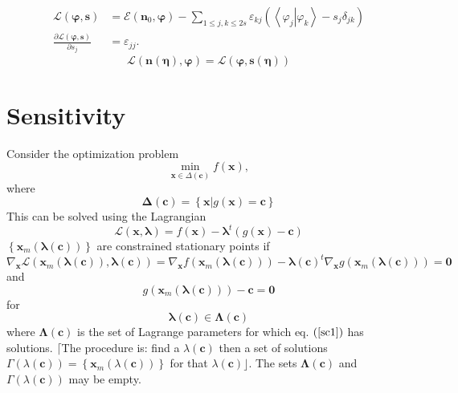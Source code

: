\documentclass[aps,preprint]{revtex4}%
\begin{document}
\begin{align}
\mathcal{L}\left(  \mathbf{\varphi,s}\right)   &  =\mathcal{E}\left(
\mathbf{n}_{0}\mathbf{,\varphi}\right)  -\sum_{1\leq j,k\leq2s}\varepsilon
_{kj}\left(  \left\langle \left.  \varphi_{j}\right\vert \varphi
_{k}\right\rangle -s_{j}\delta_{jk}\right) \\
\frac{\partial\mathcal{L}\left(  \mathbf{\varphi,s}\right)  }{\partial s_{j}}
&  =\varepsilon_{jj}.
\end{align}%
\begin{equation}
\mathcal{L}\left(  \mathbf{n\left(  \mathbf{\eta}\right)  ,\varphi}\right)
=\mathcal{L}\left(  \mathbf{\varphi,s}\left(  \mathbf{\eta}\right)  \right)
\end{equation}


\section{Sensitivity}

Consider the optimization problem
\[
\min_{\mathbf{x\in}\Delta\left(  \mathbf{c}\right)  }f\left(  \mathbf{x}%
\right)  ,
\]
where
\[
\mathbf{\Delta}\left(  \mathbf{c}\right)  \mathcal{=}\left\{  \mathbf{x}%
\left\vert g\left(  \mathbf{x}\right)  =\mathbf{c}\right.  \right\}
\]
This can be solved using the Lagrangian
\[
\mathcal{L}\left(  \mathbf{x,\lambda}\right)  =f\left(  \mathbf{x}\right)
-\mathbf{\lambda}^{t}\left(  g\left(  \mathbf{x}\right)  -\mathbf{c}\right)
\]
$\left\{  \mathbf{x}_{m}\left(  \mathbf{\lambda}\left(  \mathbf{c}\right)
\right)  \right\}  $ are constrained stationary points if
\[
\nabla_{\mathbf{x}}\mathcal{L}\left(  \mathbf{x}_{m}\left(  \mathbf{\lambda
}\left(  \mathbf{c}\right)  \right)  \mathbf{,\lambda}\left(  \mathbf{c}%
\right)  \right)  =\nabla_{\mathbf{x}}f\left(  \mathbf{x}_{m}\left(
\mathbf{\lambda}\left(  \mathbf{c}\right)  \right)  \right)  -\mathbf{\lambda
}\left(  \mathbf{c}\right)  ^{t}\nabla_{\mathbf{x}}g\left(  \mathbf{x}%
_{m}\left(  \mathbf{\lambda}\left(  \mathbf{c}\right)  \right)  \right)
=\mathbf{0}%
\]
and
\[
g\left(  \mathbf{x}_{m}\left(  \mathbf{\lambda}\left(  \mathbf{c}\right)
\right)  \right)  -\mathbf{c=0}%
\]
for
\[
\mathbf{\lambda}\left(  \mathbf{c}\right)  \mathbf{\in\Lambda}\left(
\mathbf{c}\right)
\]
where $\mathbf{\Lambda}\left(  \mathbf{c}\right)  $ is the set of Lagrange
parameters for which eq. $\left(  \ref{sc1}\right)  $ has solutions. $\lceil
$The procedure is: find a $\lambda\left(  \mathbf{c}\right)  $ then a set of
solutions $\Gamma\left(  \lambda\left(  \mathbf{c}\right)  \right)  =\left\{
\mathbf{x}_{m}\left(  \lambda\left(  \mathbf{c}\right)  \right)  \right\}  $
for that $\lambda\left(  \mathbf{c}\right)  \rfloor$. The sets
$\mathbf{\Lambda}\left(  \mathbf{c}\right)  $ and $\Gamma\left(
\lambda\left(  \mathbf{c}\right)  \right)  $ may be empty.
\end{document}
